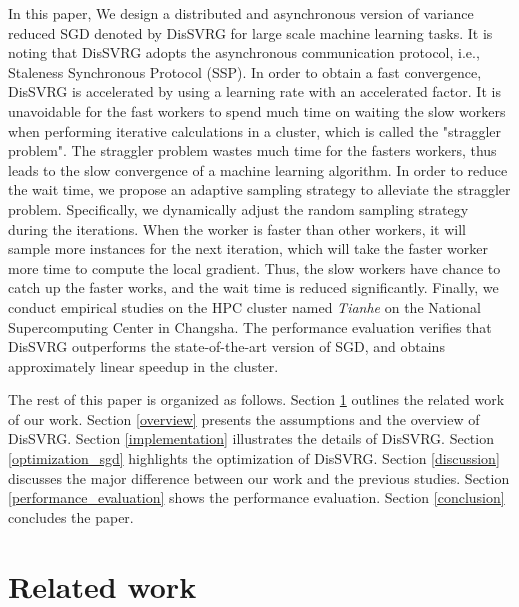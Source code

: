 \documentclass[10pt,journal,finalsubmission,compsoc]{IEEEtran}
\begin{document}
In this paper, We design a distributed and asynchronous version of variance reduced SGD denoted by DisSVRG for large scale machine learning tasks. It is noting that DisSVRG adopts the asynchronous communication protocol, i.e., Staleness Synchronous Protocol (SSP). In order to obtain a fast convergence, DisSVRG is accelerated by using a learning rate with an accelerated factor. It is unavoidable for the fast workers to spend much time on waiting the slow workers when performing iterative calculations  in a cluster, which is called the "straggler problem". The straggler problem wastes much time for the fasters workers, thus leads to the slow convergence of a machine learning algorithm. In order to reduce the wait time, we propose an adaptive sampling strategy to alleviate the straggler problem. Specifically, we dynamically adjust the random sampling strategy during the iterations. When the worker is faster than other workers, it will  sample more instances for the next iteration, which will take the faster worker more time to compute the local gradient.   Thus, the slow workers have chance to catch up the faster works, and  the wait time is reduced significantly. Finally, we conduct empirical studies on the HPC cluster named \emph{Tianhe} on the National Supercomputing Center in Changsha. The performance evaluation verifies that DisSVRG outperforms the state-of-the-art version of SGD, and obtains approximately linear speedup in the cluster.

The rest of this paper is organized as follows. Section \ref{related_work} outlines the related work of our work. Section \ref{overview} presents the assumptions and the overview of DisSVRG. Section \ref{implementation} illustrates the details of DisSVRG. Section \ref{optimization_sgd} highlights the  optimization of DisSVRG. Section \ref{discussion} discusses the major difference between our work and the previous studies. Section \ref{performance_evaluation} shows the performance evaluation. Section \ref{conclusion} concludes the paper.



\section{Related work}
\label{related_work}
\end{document}
